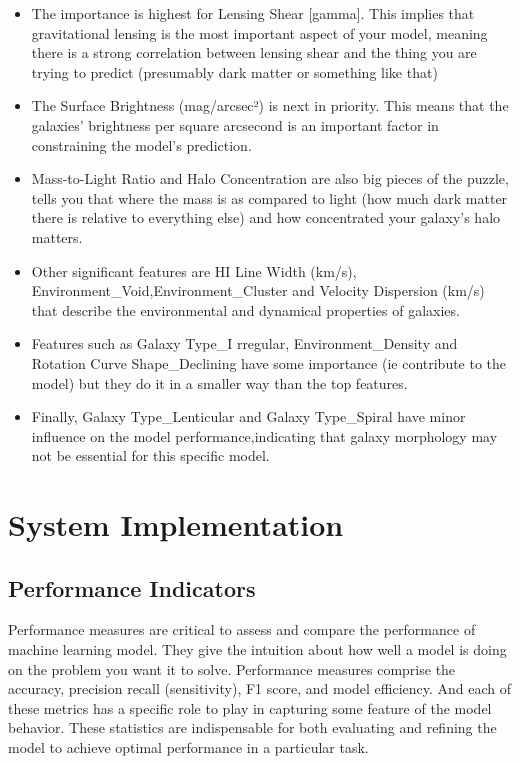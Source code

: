 \begin{itemize}
    \item The importance is highest for Lensing Shear [gamma]. This implies that gravitational lensing is the most important aspect of your model, meaning there is a strong correlation between lensing shear and the thing you are trying to predict (presumably dark matter or something like that)

    \item The Surface Brightness (mag/arcsec²) is next in priority. This means that the galaxies’ brightness per square arcsecond is an important factor in constraining the model’s prediction.

    \item Mass-to-Light Ratio and Halo Concentration are also big pieces of the puzzle, tells you that where the mass is as compared to light (how much dark matter there is relative to everything else) and how concentrated your galaxy’s halo matters.

    \item Other significant features are HI Line Width (km/s), Environment\_Void,Environment\_Cluster and Velocity Dispersion (km/s) that describe the environmental and dynamical properties of galaxies.

    \item Features such as Galaxy Type\_I rregular, Environment\_Density and Rotation Curve Shape\_Declining have some importance (ie contribute to the model) but they do it in a smaller way than the top features.

    \item Finally, Galaxy Type\_Lenticular and Galaxy Type\_Spiral have minor influence on the model performance,indicating that galaxy morphology may not be essential for this specific model.

\end{itemize}
 


\section{System Implementation}
\subsection{Performance Indicators}


Performance measures are critical to assess and compare the performance of machine learning model. They give the intuition about how well a model is doing on the problem you want it to solve. Performance measures comprise the accuracy, precision recall (sensitivity), F1 score, and model efficiency. And each of these metrics has a specific role to play in capturing some feature of the model behavior. These statistics are indispensable for both evaluating and refining the model to achieve optimal performance in a particular task.


